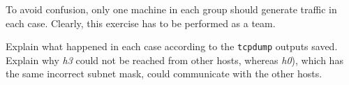 \documentclass{../UTNetLab}
\begin{document}
    To avoid confusion, only one machine in each group should generate traffic in each case.
    Clearly, this exercise has to be performed as a team.
    
    \begin{report}
    \item Explain what happened in each case according to the \lstinline{tcpdump} outputs saved.
    Explain why \textit{h3} could not be reached from other hosts, whereas \textit{h0}), which has the same incorrect subnet mask, could communicate with the other hosts.
    \end{report}
\end{document}
